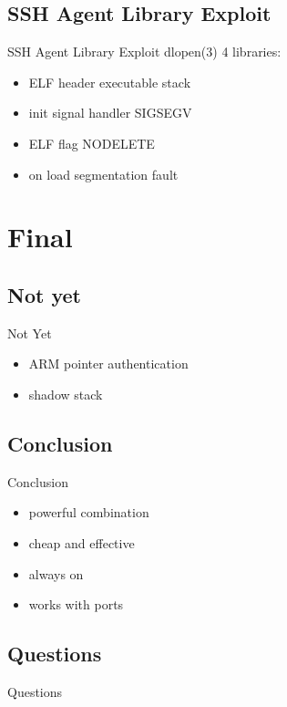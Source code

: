 \documentclass[14pt,aspectratio=169]{beamer}
\begin{document}
\subsection{SSH Agent Library Exploit}
\begin{frame}{SSH Agent Library Exploit}
dlopen(3) 4 libraries:
\begin{itemize}
  \item ELF header executable stack 
  \item init signal handler SIGSEGV
  \item ELF flag NODELETE
  \item on load segmentation fault
\end{itemize}
\end{frame}

\section{Final}

\subsection{Not yet}
\begin{frame}{Not Yet}
\begin{itemize}
  \item ARM pointer authentication
  \item shadow stack
\end{itemize}
\end{frame}

\subsection{Conclusion}
\begin{frame}{Conclusion}
\begin{itemize}
  \item powerful combination
  \item cheap and effective
  \item always on
  \item works with ports
\end{itemize}
\end{frame}

\subsection{Questions}
\begin{frame}{Questions}
\begin{center}
\end{center}
\end{frame}
\end{document}
